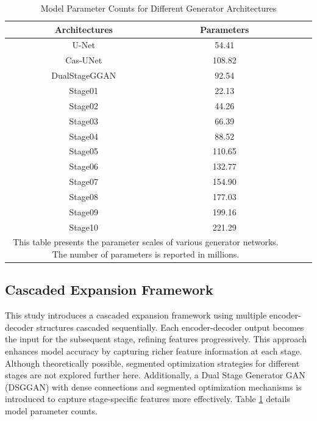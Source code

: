 \documentclass[a4paper, times, 10pt,twocolumn]{article}
\begin{document}
\begin{table}[h]
	\centering
	\caption{Model Parameter Counts for Different Generator Architectures}
	\label{tab:model_parameters}
	\begin{tabular}{ccccc}
		\hline
		Architectures                                                   & Parameters \\
		\hline
		U-Net\cite{navab_u-net_2015}                                    & 54.41      \\
		Cas-UNet\cite{zeng_swin-casunet_2022}                           & 108.82     \\
		DualStageGGAN\cite{wang_dsg-gandual-stage-generator-based_2024} & 92.54      \\
		Stage01                                                         & 22.13      \\
		Stage02                                                         & 44.26      \\
		Stage03                                                         & 66.39      \\
		Stage04                                                         & 88.52      \\
		Stage05                                                         & 110.65     \\
		Stage06                                                         & 132.77     \\
		Stage07                                                         & 154.90     \\
		Stage08                                                         & 177.03     \\
		Stage09                                                         & 199.16     \\
		Stage10                                                         & 221.29     \\
		\hline
		\multicolumn{2}{p{196pt}}{This table presents the parameter scales of various generator networks. The number of parameters is reported in millions.}
	\end{tabular}
\end{table}

\subsection{Cascaded Expansion Framework}
This study introduces a cascaded expansion framework using multiple encoder-decoder structures cascaded sequentially. Each encoder-decoder output becomes the input for the subsequent stage, refining features progressively. This approach enhances model accuracy by capturing richer feature information at each stage. Although theoretically possible, segmented optimization strategies for different stages are not explored further here. Additionally, a Dual Stage Generator GAN (DSGGAN) with dense connections and segmented optimization mechanisms is introduced to capture stage-specific features more effectively. Table \ref{tab:model_parameters} details model parameter counts.
\end{document}
